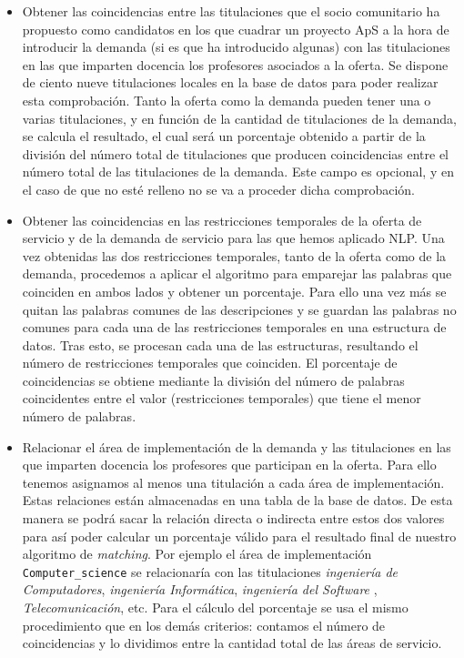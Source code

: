 \documentclass[11pt]{book}
\begin{document}
\begin{itemize}
		\item Obtener las coincidencias entre las titulaciones que el socio
		comunitario ha propuesto como candidatos en los que cuadrar un proyecto
		ApS a la hora de introducir la demanda (si es que ha introducido algunas) con las titulaciones en las que imparten docencia los profesores asociados a la oferta. 
		Se dispone de ciento nueve titulaciones locales en la base de datos para poder realizar esta comprobación. Tanto la oferta como la demanda pueden tener una o varias titulaciones, y en función de la cantidad de titulaciones de la demanda, se calcula el resultado, el cual será un porcentaje obtenido a partir de la división del número total de titulaciones que producen coincidencias entre el número total de las titulaciones de la demanda. Este campo es opcional, y en el caso de que no esté relleno no se va a proceder dicha comprobación.
		
		\item Obtener las coincidencias en las restricciones temporales de la oferta de servicio y de la demanda de servicio para las que hemos aplicado NLP. Una vez obtenidas las dos restricciones temporales, tanto de la oferta como de la demanda, procedemos a aplicar el algoritmo para emparejar las palabras que coinciden en ambos lados y obtener un porcentaje. Para ello una vez más se quitan las palabras comunes de las descripciones y se guardan las palabras no comunes para cada una de las restricciones temporales en una estructura de datos. Tras esto, se procesan cada una de las estructuras, resultando el número de restricciones temporales que coinciden. El porcentaje de coincidencias se obtiene mediante la división del número de palabras coincidentes entre el valor (restricciones temporales) que tiene el menor número de palabras.
		
		\item Relacionar el área de implementación de la demanda y las titulaciones en las que imparten docencia los profesores que participan en la oferta. Para ello tenemos asignamos al menos una titulación a cada área de implementación. Estas relaciones están almacenadas en una tabla de la base de datos. De esta manera se podrá sacar la relación directa o indirecta entre estos dos valores para así poder calcular un porcentaje válido para el resultado final de nuestro algoritmo de \emph{matching}. Por ejemplo el área de implementación \texttt{Computer\_science} se relacionaría con las titulaciones \emph{ingeniería de Computadores}, \emph{ingeniería Informática}, \emph{ingeniería del Software} , \emph{Telecomunicación}, etc. Para el cálculo del porcentaje se usa el mismo procedimiento que en los demás criterios: contamos el número de coincidencias y lo dividimos entre la cantidad total de las áreas de servicio.
		

\end{itemize}
\end{document}
